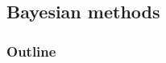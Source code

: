\documentclass[color=usenames,dvipsnames]{beamer}\usepackage[]{graphicx}\usepackage[]{color}
\begin{document}







\subsection{Bayesian methods}


\begin{frame}
  \frametitle{Outline}
  \Large
\end{frame}










\end{document}
